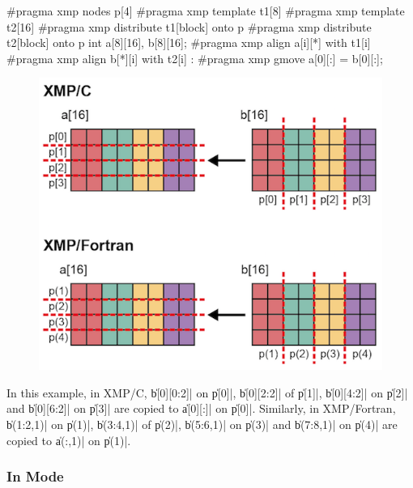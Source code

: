 \begin{XCexample}
#pragma xmp nodes p[4]
#pragma xmp template t1[8]
#pragma xmp template t2[16]
#pragma xmp distribute t1[block] onto p
#pragma xmp distribute t2[block] onto p
int a[8][16], b[8][16];
#pragma xmp align a[i][*] with t1[i]
#pragma xmp align b[*][i] with t2[i]
     :
#pragma xmp gmove
  a[0][:] = b[0][:];
\end{XCexample}


\begin{figure}
  \centering
  \includegraphics{figs/gmove_different.png}
\end{figure}

In this example, in XMP/C, \|b[0][0:2]| on \|p[0]|, \|b[0][2:2]| of
\|p[1]|, \|b[0][4:2]| on \|p[2]| and \|b[0][6:2]| on \|p[3]| are copied
to \|a[0][:]| on \|p[0]|. Similarly, in XMP/Fortran, \|b(1:2,1)| on
\|p(1)|, \|b(3:4,1)| of \|p(2)|, \|b(5:6,1)| on \|p(3)| and \|b(7:8,1)|
on \|p(4)| are copied to \|a(:,1)| on \|p(1)|.


\subsubsection{In Mode}

